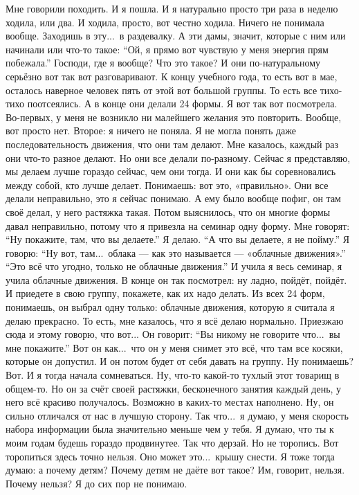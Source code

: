 Мне говорили походить.
И я пошла.
И я натурально просто три раза в неделю ходила, или два.
И ходила, просто, вот честно ходила.
Ничего не понимала вообще.
Заходишь в эту...\ в раздевалку.
А эти дамы, значит, которые с ним или начинали или что-то такое:
``Ой, я прямо вот чувствую у меня энергия прям побежала.''
Господи, где я вообще?
Что это такое?
И они по-натуральному серьёзно вот так вот разговаривают.
К концу учебного года, то есть вот в мае, осталось наверное человек пять от этой вот
большой группы.
То есть все тихо-тихо поотсеялись.
А в конце они делали 24 формы.
Я вот так вот посмотрела.
Во-первых, у меня не возникло ни малейшего желания это повторить.
Вообще, вот просто нет.
Второе: я ничего не поняла.
Я не могла понять даже последовательность движения, что они там делают.
Мне казалось, каждый раз они что-то разное делают.
Но они все делали по-разному.
Сейчас я представляю, мы делаем лучше гораздо сейчас, чем они тогда.
И они как бы соревновались между собой, кто лучше делает.
Понимаешь: вот это, «правильно». Они все делали неправильно, это я сейчас понимаю.
А ему было вообще пофиг, он там своё делал, у него растяжка такая.
Потом выяснилось, что он многие формы давал неправильно, потому что я привезла на семинар
одну форму.
Мне говорят: ``Ну покажите, там, что вы делаете.'' Я делаю.
``А что вы делаете, я не пойму.'' Я говорю: ``Ну вот, там...\ облака --- как это называется
--- «облачные движения».''
``Это всё что угодно, только не облачные движения.''
И учила я весь семинар, я учила облачные движения.
В конце он так посмотрел: ну ладно, пойдёт, пойдёт.
И приедете в свою группу, покажете, как их надо делать.
Из всех 24 форм, понимаешь, он выбрал одну только: облачные движения, которую я считала
я делаю прекрасно.
То есть, мне казалось, что я всё делаю нормально.
Приезжаю сюда и этому говорю, что вот...
Он говорит: ``Вы никому не говорите что...\ вы мне покажите.'' Вот он как...\
что он у меня снимет это всё, что там все косяки, которые он допустил.
И он потом будет от себя давать на группу.
Ну понимаешь?
Вот. И я тогда начала сомневаться.
Ну, что-то какой-то тухлый этот товарищ в общем-то.
Но он за счёт своей растяжки, бесконечного занятия каждый день, у него всё красиво получалось.
Возможно в каких-то местах наполнено.
Ну, он сильно отличался от нас в лучшую сторону.
Так что...\ я думаю, у меня скорость набора информации была значительно меньше чем у тебя.
Я думаю, что ты к моим годам будешь гораздо продвинутее.
Так что дерзай.
Но не торопись.
Вот торопиться здесь точно нельзя.
Оно может это...\ крышу снести.
Я тоже тогда думаю: а почему детям?
Почему детям не даёте вот такое?
Им, говорит, нельзя.
Почему нельзя?
Я до сих пор не понимаю.

